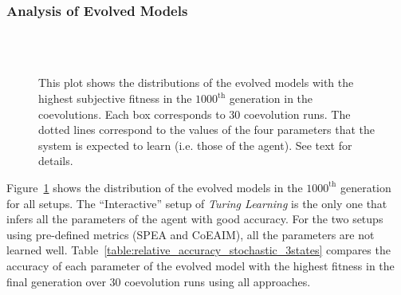 \subsubsection{Analysis of Evolved Models}
\begin{figure}[!t]%
	\centering
		\\
		\\
		\caption{This plot shows the distributions of the evolved models with the highest subjective fitness in the $1000^\textrm{th}$ generation in the coevolutions. Each box corresponds to $30$ coevolution runs. The dotted lines correspond to the values of the four parameters that the system is expected to learn (i.e. those of the agent). See text for details.\label{fig:parameters_box_stochastic_three_states}}
\end{figure}

Figure~\ref{fig:parameters_box_stochastic_three_states} shows the distribution of the evolved models in the $1000^\mathrm{th}$ generation for all setups. The ``Interactive'' setup of \textit{Turing Learning} is the only one that infers all the parameters of the agent with good accuracy. For the two setups using pre-defined metrics (SPEA and CoEAIM), all the parameters are not learned well. Table~\ref{table:relative_accuracy_stochastic_3states} compares the accuracy of each parameter of the evolved model with the highest fitness in the final generation over $30$ coevolution runs using all approaches.

